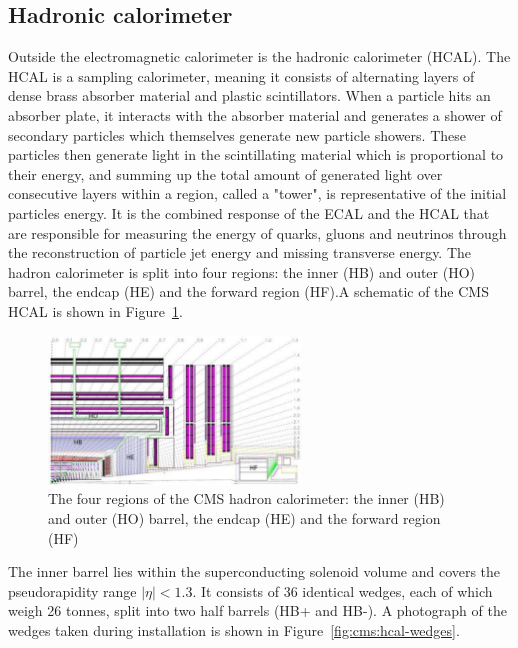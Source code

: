\subsection{Hadronic calorimeter}
Outside the electromagnetic calorimeter is the hadronic calorimeter (HCAL). The HCAL is a sampling calorimeter, meaning it consists of alternating layers of dense brass absorber material and plastic scintillators. When a particle hits an absorber plate, it interacts with the absorber material and generates a shower of secondary particles which themselves generate new particle showers. These particles then generate light in the scintillating material which is proportional to their energy, and summing up the total amount of generated light over consecutive layers within a region, called a "tower", is representative of the initial particles energy. It is the combined response of the ECAL and the HCAL that are responsible for measuring the energy of quarks, gluons and neutrinos through the reconstruction of particle jet energy and missing transverse energy. The hadron calorimeter is split into four regions: the inner (HB) and outer (HO) barrel, the endcap (HE) and the forward region (HF).A schematic of the CMS HCAL is shown in Figure~\ref{fig:cms:hcal}.
\begin{figure}[h] 
    \centering
    \includegraphics[width=0.6\textwidth]{figures/cms/HCAL.pdf}
    \caption{The four regions of the CMS hadron calorimeter:  the inner (HB) and outer (HO) barrel, the endcap (HE) and the forward region (HF)~\cite{Chatrchyan:2008aa}}
    \label{fig:cms:hcal}
\end{figure}
The inner barrel lies within the superconducting solenoid volume and covers the pseudorapidity range $|\eta|<1.3$.
It consists of 36 identical wedges, each of which weigh 26 tonnes, split into two half barrels (HB+ and HB-).
A photograph of the wedges taken during installation is shown in Figure~\ref{fig:cms:hcal-wedges}. 
